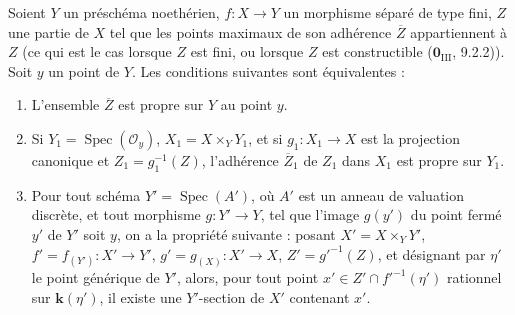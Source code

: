 \begin{corollary}[15.7.4]
\label{IV.15.7.4-fr}
Soient $Y$ un préschéma noethérien, $f:X\to Y$ un morphisme séparé de type fini, $Z$ une partie de $X$ tel que les points maximaux de son adhérence $\overline Z$ appartiennent à $Z$ (ce qui est le cas lorsque $Z$ est fini, ou lorsque $Z$ est constructible ($\mathbf{0}_{\mathrm{III}}$, 9.2.2)). Soit $y$ un point de $Y$. Les conditions suivantes sont équivalentes :
\begin{enumerate}
  \item[\rm a)] L'ensemble $\overline Z$ est propre sur $Y$ au point $y$.
  \item[\rm b)] Si $Y_1=\operatorname{Spec}(\mathcal O_y)$, $X_1=X\times_Y Y_1$, et si $g_1:X_1\to X$ est la projection canonique et $Z_1=g_1^{-1}(Z)$, l'adhérence $\overline Z_1$ de $Z_1$ dans $X_1$ est propre sur $Y_1$.
  \item[\rm c)] Pour tout schéma $Y'=\operatorname{Spec}(A')$, où $A'$ est un anneau de valuation discrète, et tout morphisme $g:Y'\to Y$, tel que l'image $g(y')$ du point fermé $y'$ de $Y'$ soit $y$, on a la propriété suivante : posant $X'=X\times_Y Y'$, $f'=f_{(Y')}:X'\to Y'$, $g'=g_{(X)}:X'\to X$, $Z'=g'^{-1}(Z)$, et désignant par $\eta'$
le point générique de $Y'$, alors, pour tout point $x'\in Z'\cap f'^{-1}(\eta')$ rationnel sur $\mathbf k(\eta')$, il existe une $Y'$-section de $X'$ contenant $x'$.
\end{enumerate}
\end{corollary}

